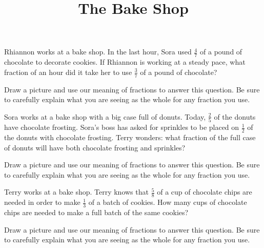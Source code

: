 \documentclass[nooutcomes,noauthor]{ximera}
\title{The Bake Shop}
\begin{document}
\begin{abstract}
\end{abstract}

\maketitle

\begin{problem}
Rhiannon works at a bake shop. In the last hour, Sora used $\frac{4}{7}$ of a pound of chocolate to decorate cookies. If Rhiannon is working at a steady pace, what fraction of an hour did it take her to use $\frac{3}{7}$ of a pound of chocolate?

Draw a picture and use our meaning of fractions to answer this question. Be sure to carefully explain what you are seeing as the whole for any fraction you use.
\end{problem}

\begin{problem}
Sora works at a bake shop with a big case full of donuts. Today, $\frac{2}{5}$ of the donuts have chocolate frosting. Sora's boss has asked for sprinkles to be placed on $\frac{1}{2}$ of the donuts with chocolate frosting. Terry wonders: what fraction of the full case of donuts will have both chocolate frosting and sprinkles?

Draw a picture and use our meaning of fractions to answer this question. Be sure to carefully explain what you are seeing as the whole for any fraction you use.
\end{problem}


\begin{problem}
Terry works at a bake shop. Terry knows that $\frac{5}{8}$ of a cup of chocolate chips are needed  in order to make $\frac{1}{3}$ of a batch of cookies. How many cups of chocolate chips are needed to make a full batch of the same cookies?

Draw a picture and use our meaning of fractions to answer this question. Be sure to carefully explain what you are seeing as the whole for any fraction you use.
\end{problem}





\newpage
\end{document}
